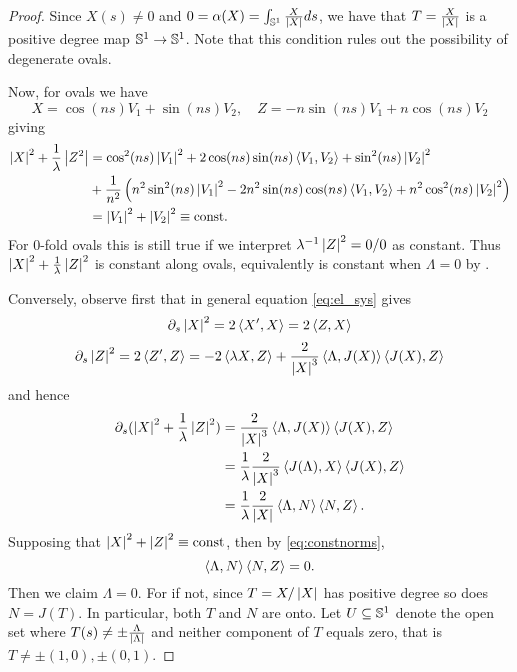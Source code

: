 \documentclass[12pt]{article}
\begin{document}
\begin{proof}
Since \(X(s) \ne 0\) and \(0 = \alpha(X) = \int_{\operatorname{\mathbb{S}^1}} \tfrac{X}{\left|{X}\right|}ds\), we have that \(T = \tfrac{X}{\left|{X}\right|}\) is a positive degree map \(\operatorname{\mathbb{S}^1} \to \operatorname{\mathbb{S}^1}\). Note that this condition rules out the possibility of degenerate ovals.

Now, for ovals we have
\[
X = \cos (ns) V_1 + \sin (ns) V_2 , \quad Z = -n\sin (ns) V_1 + n\cos (ns) V_2
\]
giving
\[
\begin{split}
\left|{X}\right|^2 + \frac{1}{\lambda} \left|{Z^2}\right| &= \cos^2 (ns) \left|{V_1}\right|^2 + 2 \cos (ns) \sin (ns) \left\langle{V_1},{V_2}\right\rangle + \sin^2 (ns) \left|{V_2}\right|^2 \\
&+ \frac{1}{n^2} \left(n^2 \sin^2 (ns) \left|{V_1}\right|^2 - 2n^2 \sin (ns) \cos (ns) \left\langle{V_1},{V_2}\right\rangle + n^2 \cos^2 (ns) \left|{V_2}\right|^2\right) \\
&= \left|{V_1}\right|^2 + \left|{V_2}\right|^2 \equiv \text{const}.
\end{split}
\]
For \(0\)-fold ovals this is still true if we interpret \(\lambda^{-1} \left|{Z}\right|^2 = 0/0\) as constant. Thus \(\left|{X}\right|^2 + \frac{1}{\lambda} \left|{Z}\right|^2\) is constant along ovals, equivalently is constant when \(\Lambda = 0\) by .

Conversely, observe first that in general equation \eqref{eq:el_sys} gives
\[
\partial_s \left|{X}\right|^2 = 2\left\langle{X'},{X}\right\rangle = 2\left\langle{Z},{X}\right\rangle
\]
\[
\partial_s \left|{Z}\right|^2 = 2\left\langle{Z'},{Z}\right\rangle = -2\left\langle{\lambda X},{Z}\right\rangle + \frac{2}{\left|{X}\right|^3}\left\langle{\Lambda},{J(X)}\right\rangle\left\langle{J(X)},{Z}\right\rangle
\]
and hence
\begin{equation}
\label{eq:constnorms}
\begin{split}
\partial_s (\left|{X}\right|^2 + \frac{1}{\lambda} \left|{Z}\right|^2) &= \frac{2}{\left|{X}\right|^3}\left\langle{\Lambda},{J(X)}\right\rangle\left\langle{J(X)},{Z}\right\rangle \\
&= \frac{1}{\lambda}\frac{2}{\left|{X}\right|^3}\left\langle{J(\Lambda)},{X}\right\rangle\left\langle{J(X)},{Z}\right\rangle \\
&= \frac{1}{\lambda}\frac{2}{\left|{X}\right|}\left\langle{\Lambda},{N}\right\rangle\left\langle{N},{Z}\right\rangle.
\end{split}
\end{equation}
Supposing that \(\left|{X}\right|^2 + \left|{Z}\right|^2 \equiv \text{const}\), then by \eqref{eq:constnorms},
\[
\left\langle{\Lambda},{N}\right\rangle\left\langle{N},{Z}\right\rangle = 0.
\]
Then we claim \(\Lambda = 0\). For if not, since \(T = X/\left|{X}\right|\) has positive degree so does \(N = J(T)\). In particular, both \(T\) and \(N\) are onto. Let \(U \subseteq \operatorname{\mathbb{S}^1}\) denote the open set where \(T(s) \ne \pm \tfrac{\Lambda}{\left|{\Lambda}\right|}\) and neither component of \(T\) equals zero, that is \(T \ne \pm (1, 0), \pm (0, 1)\).


\end{proof}
\end{document}
